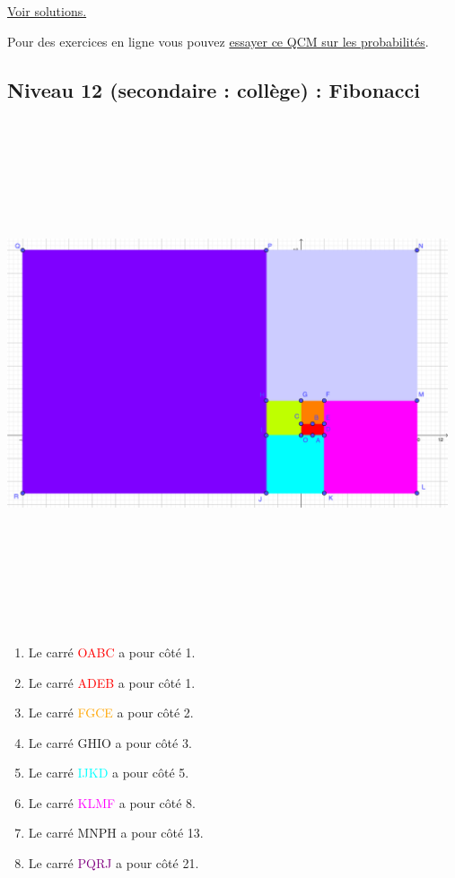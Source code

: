 \documentclass[11pt]{article}
\begin{document}
\hyperref[org4b30b54]{Voir solutions.}

Pour des exercices en ligne vous pouvez \href{https://didaskalosmanthanon.github.io/qcm-proba/}{essayer ce QCM sur les probabilités}.

\newpage

\subsection{Niveau 12 (secondaire : collège) : Fibonacci}
\label{sec:org219a353}

\label{org9bce7c2}

\begin{center}
\includegraphics[width=0.975\textwidth, height=15cm, keepaspectratio]{./images/fibonacci-square.png}
\end{center}


\begin{enumerate}
\item Le carré \textcolor{red}{OABC} a pour côté 1.
\item Le carré \textcolor{red}{ADEB} a pour côté 1.
\item Le carré \textcolor{orange}{FGCE} a pour côté 2.
\item Le carré \textcolor{citron}{GHIO} a pour côté 3.
\item Le carré \textcolor{cyan}{IJKD} a pour côté 5.
\item Le carré \textcolor{magenta}{KLMF} a pour côté 8.
\item Le carré \textcolor{pourpre}{MNPH} a pour côté 13.
\item Le carré \textcolor{purple}{PQRJ} a pour côté 21.
\end{enumerate}
\end{document}

